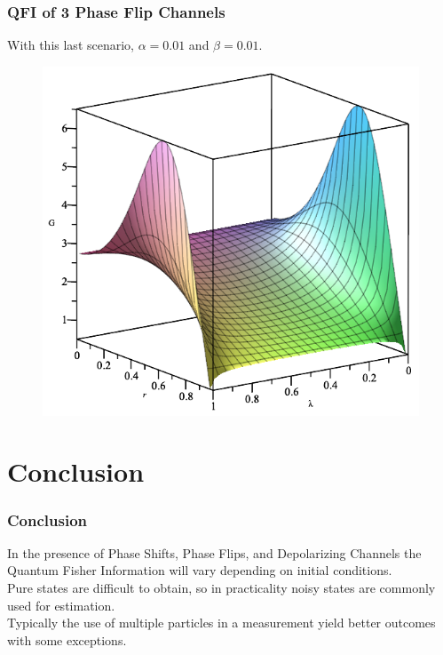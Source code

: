 \documentclass{beamer}
\begin{document}
\begin{frame}
\frametitle{QFI of 3 Phase Flip Channels}
With this last scenario, $\alpha=0.01$ and $\beta=0.01$.
\begin{figure}
\begin{center}
\includegraphics[width=0.75\linewidth]{Phase-Flip-Triple-Channel-Alpha=001-Beta=001-Gain-Graph.png}
\end{center}
\end{figure}
\end{frame}
\section{Conclusion}
\begin{frame}
\frametitle{Conclusion}
In the presence of Phase Shifts, Phase Flips, and Depolarizing Channels the Quantum Fisher Information will vary depending on initial conditions. \\
\vspace{10pt}
Pure states are difficult to obtain, so in practicality noisy states are commonly used for estimation. \\
\vspace{10pt}
Typically the use of multiple particles in a measurement yield better outcomes with some exceptions.
\end{frame}
\end{document}
